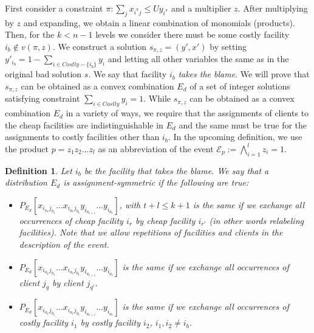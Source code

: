 \documentclass[11pt]{article}
\newtheorem{definition}{Definition}[section]
\begin{document}
First   consider  a  constraint   $\pi\colon  \sum_{j}x_{i^{\pi}j}\leq
Uy_{i^{\pi}}$ and a multiplier $z$.   After multiplying by $z$ and
expanding,  we obtain
a   linear  combination   of  monomials
(products). Then, for the  $k< n-1$ levels
we  consider   there  must  be   some  costly  facility   $i_b  \notin
v(\pi,z)$.  We construct  a solution  $s_{\pi ,z}=(y',x')$  by setting
$y'_{i_b}=1-\sum_{i  \in  Costly-\{i_b\}}y_i$  and letting  all  other
variables the  same as in the  original bad solution $s$.  We say that
facility  $i_b$  \emph{takes the  blame}.  We  will   prove  that
$s_{\pi ,z}$ can be obtained as a convex combination $E_d$ of a set of
integer   solutions    satisfying   constraint   $\sum_{i\in   Costly}
y_i=1$.  While
$s_{\pi,z}$ can be obtained as a convex combination $E_d$ in a variety of
ways, we require that the assignments of clients to the cheap facilities are
indistinguishable in $E_d$ and the same must be true for the assignments to
costly facilities other than $i_b$.  In the upcoming definition, we 
use  the product $p=z_1z_2\ldots z_l$ as an  abbreviation
of the event $\mathcal{E}_p := \bigwedge_{i=1}^{l} z_i = 1.$ 

\begin{definition}
 Let $i_b$ be the facility that takes the blame. We say that a distribution $E_d$ is \emph{assignment-symmetric}  if the following are true:
\vspace*{-0.1cm}
\begin{itemize}
\item[1] $P_{E_d}[x_{i_{a_1}j_{b_1}}\ldots x_{i_{a_t}j_{b_t}}y_{i_{a_{t+1}}}\ldots y_{i_{a_{l}}}]$,  with $t+l \leq k+1$ is the same if we exchange all occurrences of cheap facility $i_{r}$ by cheap facility $i_{r'}$ (in other words relabeling facilities). Note that we allow repetitions of facilities and clients in the description of the event.

\item[2]  $P_{E_d}[x_{i_{a_1}j_{b_1}}\ldots x_{i_{a_t}j_{b_t}}y_{i_{a_{t+1}}}\ldots y_{i_{a_{l}}}]$ is the same if we exchange all occurrences of client $j_q$ by client $j_{q'}$.

\item[3]  $P_{E_d}[x_{i_{a_1}j_{b_1}}\ldots x_{i_{a_t}j_{b_t}}y_{i_{a_{t+1}}}\ldots y_{i_{a_{l}}}]$ is the same if we exchange all occurrences of costly facility $i_1$ by costly facility $i_2$, $i_1,i_2\neq i_b$.
\end{itemize}
\end{definition}
\vspace*{-0.1cm}
\end{document}
